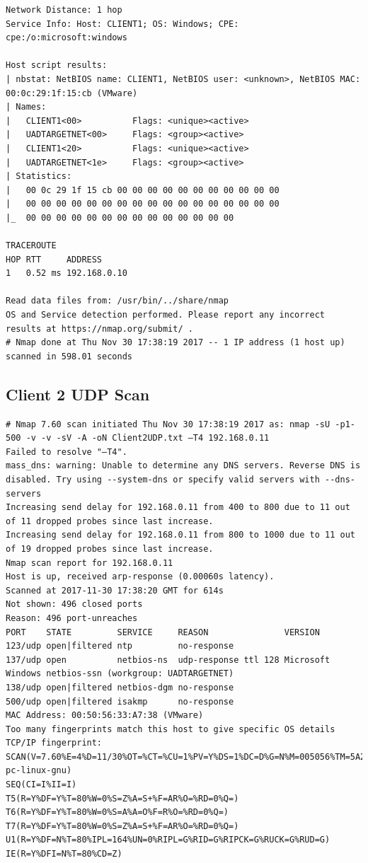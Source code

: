 \documentclass[12pt,a4paper]{article}
\begin{document}
\begin{appendices}
\begin{lstlisting}
Network Distance: 1 hop
Service Info: Host: CLIENT1; OS: Windows; CPE: cpe:/o:microsoft:windows

Host script results:
| nbstat: NetBIOS name: CLIENT1, NetBIOS user: <unknown>, NetBIOS MAC: 00:0c:29:1f:15:cb (VMware)
| Names:
|   CLIENT1<00>          Flags: <unique><active>
|   UADTARGETNET<00>     Flags: <group><active>
|   CLIENT1<20>          Flags: <unique><active>
|   UADTARGETNET<1e>     Flags: <group><active>
| Statistics:
|   00 0c 29 1f 15 cb 00 00 00 00 00 00 00 00 00 00 00
|   00 00 00 00 00 00 00 00 00 00 00 00 00 00 00 00 00
|_  00 00 00 00 00 00 00 00 00 00 00 00 00 00

TRACEROUTE
HOP RTT     ADDRESS
1   0.52 ms 192.168.0.10

Read data files from: /usr/bin/../share/nmap
OS and Service detection performed. Please report any incorrect results at https://nmap.org/submit/ .
# Nmap done at Thu Nov 30 17:38:19 2017 -- 1 IP address (1 host up) scanned in 598.01 seconds
		\end{lstlisting}
	\subsection{Client 2 UDP Scan}
	\begin{lstlisting}
# Nmap 7.60 scan initiated Thu Nov 30 17:38:19 2017 as: nmap -sU -p1-500 -v -v -sV -A -oN Client2UDP.txt –T4 192.168.0.11
Failed to resolve "–T4".
mass_dns: warning: Unable to determine any DNS servers. Reverse DNS is disabled. Try using --system-dns or specify valid servers with --dns-servers
Increasing send delay for 192.168.0.11 from 400 to 800 due to 11 out of 11 dropped probes since last increase.
Increasing send delay for 192.168.0.11 from 800 to 1000 due to 11 out of 19 dropped probes since last increase.
Nmap scan report for 192.168.0.11
Host is up, received arp-response (0.00060s latency).
Scanned at 2017-11-30 17:38:20 GMT for 614s
Not shown: 496 closed ports
Reason: 496 port-unreaches
PORT    STATE         SERVICE     REASON               VERSION
123/udp open|filtered ntp         no-response
137/udp open          netbios-ns  udp-response ttl 128 Microsoft Windows netbios-ssn (workgroup: UADTARGETNET)
138/udp open|filtered netbios-dgm no-response
500/udp open|filtered isakmp      no-response
MAC Address: 00:50:56:33:A7:38 (VMware)
Too many fingerprints match this host to give specific OS details
TCP/IP fingerprint:
SCAN(V=7.60%E=4%D=11/30%OT=%CT=%CU=1%PV=Y%DS=1%DC=D%G=N%M=005056%TM=5A204472%P=i686-pc-linux-gnu)
SEQ(CI=I%II=I)
T5(R=Y%DF=Y%T=80%W=0%S=Z%A=S+%F=AR%O=%RD=0%Q=)
T6(R=Y%DF=Y%T=80%W=0%S=A%A=O%F=R%O=%RD=0%Q=)
T7(R=Y%DF=Y%T=80%W=0%S=Z%A=S+%F=AR%O=%RD=0%Q=)
U1(R=Y%DF=N%T=80%IPL=164%UN=0%RIPL=G%RID=G%RIPCK=G%RUCK=G%RUD=G)
IE(R=Y%DFI=N%T=80%CD=Z)


\end{lstlisting}
\end{appendices}
\end{document}
